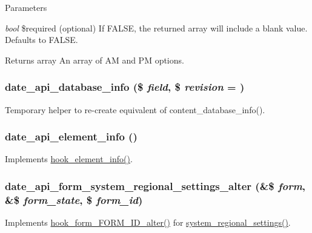 \begin{DoxyParams}{Parameters}
\item[{\em bool}]\$required (optional) If FALSE, the returned array will include a blank value. Defaults to FALSE.\end{DoxyParams}
\begin{DoxyReturn}{Returns}
array An array of AM and PM options. 
\end{DoxyReturn}
\hypertarget{date__api_8module_a53245efe16c2d5ae6063e784952ef164}{
\subsubsection[{date\_\-api\_\-database\_\-info}]{\setlength{\rightskip}{0pt plus 5cm}date\_\-api\_\-database\_\-info (\$ {\em field}, \/  \$ {\em revision} = {})}}
\label{date__api_8module_a53245efe16c2d5ae6063e784952ef164}
Temporary helper to re-\/create equivalent of content\_\-database\_\-info(). \hypertarget{date__api_8module_a6b1b048f77260adfcab2add33ded37ec}{
\subsubsection[{date\_\-api\_\-element\_\-info}]{\setlength{\rightskip}{0pt plus 5cm}date\_\-api\_\-element\_\-info ()}}
\label{date__api_8module_a6b1b048f77260adfcab2add33ded37ec}
Implements \hyperlink{group__hooks_ga3c5182432eddc82f8b7845e66a365d51}{hook\_\-element\_\-info()}. \hypertarget{date__api_8module_acbea03931dc33c56ac72db2c8042f7a5}{
\subsubsection[{date\_\-api\_\-form\_\-system\_\-regional\_\-settings\_\-alter}]{\setlength{\rightskip}{0pt plus 5cm}date\_\-api\_\-form\_\-system\_\-regional\_\-settings\_\-alter (\&\$ {\em form}, \/  \&\$ {\em form\_\-state}, \/  \$ {\em form\_\-id})}}
\label{date__api_8module_acbea03931dc33c56ac72db2c8042f7a5}
Implements \hyperlink{group__hooks_ga8d4a4089551493d55911bd5c4f218264}{hook\_\-form\_\-FORM\_\-ID\_\-alter()} for \hyperlink{group__forms_gac25147c52d45f3bfa503aaac07287826}{system\_\-regional\_\-settings()}.

